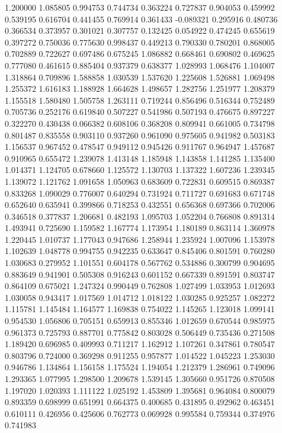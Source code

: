 1.200000
1.085805
0.994753
0.744734
0.363224
0.727837
0.904053
0.459992
0.539195
0.616704
0.441455
0.769914
0.361433
-0.089321
0.295916
0.480736
0.366534
0.373957
0.301021
0.307757
0.132425
0.054922
0.474245
0.655619
0.397272
0.750036
0.775630
0.998437
0.449213
0.790330
0.780201
0.868005
0.702889
0.722627
0.697486
0.675245
1.086882
0.668461
0.690802
0.469625
0.777080
0.461615
0.885404
0.937379
0.638377
1.028993
1.068476
1.104007
1.318864
0.709896
1.588858
1.030539
1.537620
1.225608
1.526881
1.069498
1.255372
1.616183
1.188928
1.664628
1.498657
1.282756
1.251977
1.208379
1.155518
1.580480
1.505758
1.263111
0.719244
0.856496
0.516344
0.752489
0.705736
0.252176
0.619840
0.507227
0.541986
0.507193
0.476675
0.897227
0.322270
0.430438
0.066382
0.608106
0.368208
0.809941
0.661005
0.734798
0.801487
0.835558
0.903110
0.937260
0.961090
0.975605
0.941982
0.503183
1.156537
0.967452
0.478547
0.949112
0.945426
0.911767
0.964947
1.457687
0.910965
0.655472
1.239078
1.413148
1.185948
1.143858
1.141285
1.135400
1.014371
1.124705
0.678660
1.125572
1.130703
1.137322
1.607236
1.239345
1.139072
1.121762
1.091658
1.050963
0.683609
0.722831
0.609515
0.869387
0.833268
1.090029
0.776007
0.640294
0.731924
0.711727
0.691683
0.671748
0.652640
0.635941
0.399866
0.718253
0.432551
0.656368
0.697366
0.702006
0.346518
0.377837
1.206681
0.482193
1.095703
1.052204
0.766808
0.891314
1.493941
0.725690
1.159582
1.167774
1.173954
1.180189
0.863114
1.360978
1.220445
1.010737
1.177043
0.947686
1.258944
1.235924
1.007096
1.153978
1.102639
1.048778
0.994755
0.942235
0.633647
0.845406
0.801591
0.760280
1.030683
0.279952
1.101551
0.604178
0.567762
0.534886
0.300799
0.904695
0.883649
0.941901
0.505308
0.916243
0.601152
0.667339
0.891591
0.803747
0.864109
0.675021
1.247324
0.990449
0.762808
1.027499
1.033953
1.012693
1.030058
0.943417
1.017569
1.014712
1.018122
1.030285
0.925257
1.082272
1.115781
1.145484
1.164577
1.169838
0.754022
1.145265
1.123018
1.099141
0.954530
1.056806
0.705151
0.659913
0.855346
1.012659
0.670544
0.985975
0.961373
0.725793
0.887701
0.775842
0.803028
0.506449
0.735436
0.271508
1.189420
0.696985
0.409993
0.711217
1.162912
1.107261
0.347861
0.780547
0.803796
0.724000
0.369298
0.911255
0.957877
1.014522
1.045223
1.253030
0.946786
1.134864
1.156158
1.175524
1.194054
1.212379
1.286961
0.749096
1.293365
1.077995
1.298500
1.209678
1.539145
1.305660
0.951726
0.870508
1.197020
1.020393
1.111122
1.025192
1.453809
1.395681
0.964084
0.800079
0.893359
0.698999
0.651991
0.664375
0.400685
0.431895
0.492962
0.463451
0.610111
0.426956
0.425606
0.762773
0.069928
0.995584
0.759344
0.374976
0.741983

